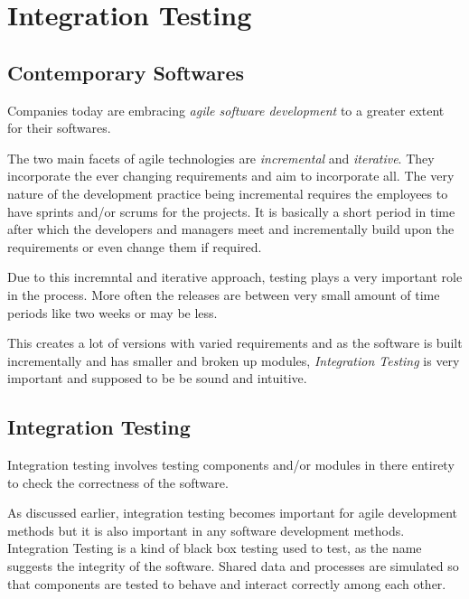 \chapter{Integration Testing} %

\label{Chapter1} %



\section{Contemporary Softwares}
Companies today are embracing \emph{agile software development} to a greater extent for their softwares.

The two main facets of agile technologies are \emph{incremental} and \emph{iterative}. They incorporate the ever changing requirements and aim to incorporate all. The very nature of the development practice being incremental requires the employees to have sprints and/or scrums for the projects. It is basically a short period in time after which the developers and managers meet and incrementally build upon the requirements or even change them if required.

Due to this incremntal and iterative approach, testing plays a very important role in the process. More often the releases are between very small amount of time periods like two weeks or may be less.

This creates a lot of versions with varied requirements and as the software is built incrementally and has smaller and broken up modules, \emph{Integration Testing} is very important and supposed to be be sound and intuitive.


\section{Integration Testing}
Integration testing involves testing components and/or modules in there entirety to check the correctness of the software.

As discussed earlier, integration testing becomes important for agile development methods but it is also important in any software development methods. Integration Testing is a kind of black box testing used to test, as the name suggests the integrity of the software. Shared data and processes are simulated so that components are tested to behave and interact correctly among each other.

